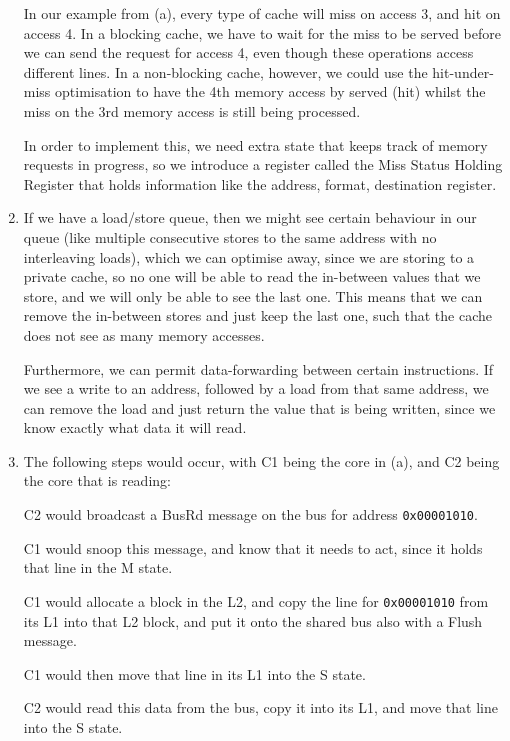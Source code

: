 \begin{enumerate}[label=(\alph*)]
    In our example from (a), every type of cache will miss on access 3, and hit on access 4. In a blocking cache, we have to wait for the miss to be served before we can send the request for access 4, even though these operations access different lines. In a non-blocking cache, however, we could use the hit-under-miss optimisation to have the 4th memory access by served (hit) whilst the miss on the 3rd memory access is still being processed.

    In order to implement this, we need extra state that keeps track of memory requests in progress, so we introduce a register called the Miss Status Holding Register that holds information like the address, format, destination register.

  \item
    If we have a load/store queue, then we might see certain behaviour in our queue (like multiple consecutive stores to the same address with no interleaving loads), which we can optimise away, since we are storing to a private cache, so no one will be able to read the in-between values that we store, and we will only be able to see the last one. This means that we can remove the in-between stores and just keep the last one, such that the cache does not see as many memory accesses.

    Furthermore, we can permit data-forwarding between certain instructions. If we see a write to an address, followed by a load from that same address, we can remove the load and just return the value that is being written, since we know exactly what data it will read.

  \item
    The following steps would occur, with C1 being the core in (a), and C2 being the core that is reading:

    C2 would broadcast a BusRd message on the bus for address \texttt{0x00001010}.

    C1 would snoop this message, and know that it needs to act, since it holds that line in the M state.

    C1 would allocate a block in the L2, and copy the line for \texttt{0x00001010} from its L1 into that L2 block, and put it onto the shared bus also with a Flush message.

    C1 would then move that line in its L1 into the S state.

    C2 would read this data from the bus, copy it into its L1, and move that line into the S state.




        
\end{enumerate}

